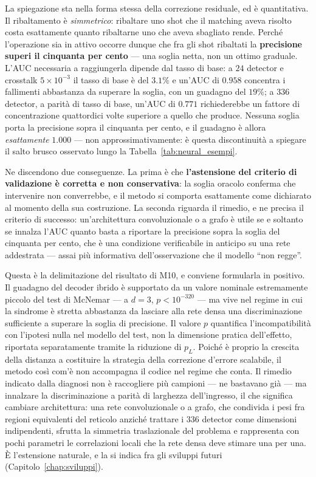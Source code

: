 La spiegazione sta nella forma stessa della correzione residuale, ed è quantitativa. Il ribaltamento è \emph{simmetrico}: ribaltare uno shot che il matching aveva risolto costa esattamente quanto ribaltarne uno che aveva sbagliato rende. Perché l'operazione sia in attivo occorre dunque che fra gli shot ribaltati la \textbf{precisione superi il cinquanta per cento} --- una soglia netta, non un ottimo graduale. L'\ac{AUC} necessaria a raggiungerla dipende dal tasso di base: a $24$ detector e crosstalk $5\times10^{-3}$ il tasso di base è del $3.1\%$ e un'\ac{AUC} di $0.958$ concentra i fallimenti abbastanza da superare la soglia, con un guadagno del $19\%$; a $336$ detector, a parità di tasso di base, un'\ac{AUC} di $0.771$ richiederebbe un fattore di concentrazione quattordici volte superiore a quello che produce. Nessuna soglia porta la precisione sopra il cinquanta per cento, e il guadagno è allora \emph{esattamente} $1.000$ --- non approssimativamente: è questa discontinuità a spiegare il salto brusco osservato lungo la Tabella~\ref{tab:neural_esempi}.

Ne discendono due conseguenze. La prima è che \textbf{l'astensione del criterio di validazione è corretta e non conservativa}: la soglia oracolo conferma che intervenire non converrebbe, e il metodo si comporta esattamente come dichiarato al momento della sua costruzione. La seconda riguarda il rimedio, e ne precisa il criterio di successo: un'architettura convoluzionale o a grafo è utile se e soltanto se innalza l'\ac{AUC} quanto basta a riportare la precisione sopra la soglia del cinquanta per cento, che è una condizione verificabile in anticipo su una rete addestrata --- assai più informativa dell'osservazione che il modello ``non regge''.

Questa è la delimitazione del risultato di M10, e conviene formularla in positivo. Il guadagno del decoder ibrido è supportato da un valore nominale estremamente piccolo del test di McNemar --- a $d=3$, $p < 10^{-320}$ --- ma vive nel regime in cui la sindrome è stretta abbastanza da lasciare alla rete densa una discriminazione sufficiente a superare la soglia di precisione. Il valore $p$ quantifica l'incompatibilità con l'ipotesi nulla nel modello del test, non la dimensione pratica dell'effetto, riportata separatamente tramite la riduzione di $p_L$. Poiché è proprio la crescita della distanza a costituire la strategia della correzione d'errore scalabile, il metodo così com'è non accompagna il codice nel regime che conta. Il rimedio indicato dalla diagnosi non è raccogliere più campioni --- ne bastavano già --- ma innalzare la discriminazione a parità di larghezza dell'ingresso, il che significa cambiare architettura: una rete convoluzionale o a grafo, che condivida i pesi fra regioni equivalenti del reticolo anziché trattare i $336$ detector come dimensioni indipendenti, sfrutta la simmetria traslazionale del problema e rappresenta con pochi parametri le correlazioni locali che la rete densa deve stimare una per una. È l'estensione naturale, e la si indica fra gli sviluppi futuri (Capitolo~\ref{chap:sviluppi}).

